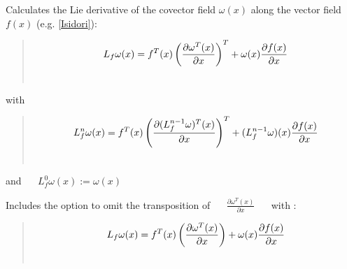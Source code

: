 \documentclass[letterpaper,10pt,english]{sphinxmanual}
\begin{document}

\begin{fulllineitems}
\label{pycontroltools:lietools.lietools.lie_deriv_covf}
Calculates the Lie derivative of the covector field $\omega(x)$
along the vector field $f(x)$ (e.g. {\hyperref[pycontroltools_sources:isidori]{{[}Isidori{]}}}):
\begin{quote}
\begin{gather}
\begin{split}L_f\omega(x) = f^T(x) \left( \frac{ \partial{\omega^T(x)} }
        { \partial{x} } \right)^{T} + \omega(x)
        \frac{ \partial{f(x)} }
        { \partial{x} }\end{split}\notag\\\begin{split}\end{split}\notag
\end{gather}\end{quote}

with
\begin{quote}
\begin{gather}
\begin{split}L_f^n\omega(x) = f^T(x) \left( \frac{ \partial{(L_f^{n-1}\omega)^T(x)} }
        { \partial{x} } \right)^{T} + (L_f^{n-1}\omega)(x)
        \frac{ \partial{f(x)} }
        { \partial{x} }\end{split}\notag\\\begin{split}\end{split}\notag
\end{gather}\end{quote}

and $\quad$ $L_f^0\omega(x) := \omega(x)$

Includes the option to omit the transposition of $\quad$
$\frac{ \partial{\omega^T(x)} }{ \partial{x} }$ $\quad$
with :
\begin{quote}
\begin{gather}
\begin{split}L_f\omega(x) = f^T(x) \left( \frac{ \partial{\omega^T(x)} }
        { \partial{x} } \right) + \omega(x)\frac{ \partial{f(x)} }
        { \partial{x} }\end{split}\notag\\\begin{split}\end{split}\notag
\end{gather}\end{quote}


\end{fulllineitems}
\end{document}
